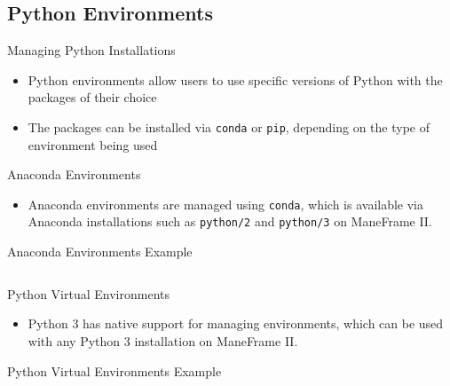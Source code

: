 \documentclass[aspectratio=169]{beamer}
\begin{document}
\subsection{Python Environments}

\begin{frame}{Managing Python Installations}
\begin{itemize}
\item Python environments allow users to use specific versions of Python with
the packages of their choice
\item The packages can be installed via \texttt{conda} or
\texttt{pip}, depending on the type of environment being used
\end{itemize}
\end{frame}

\begin{frame}{Anaconda Environments}
\begin{itemize}
\item Anaconda environments are managed using \texttt{conda}, which is
available via Anaconda installations such as \texttt{python/2} and
\texttt{python/3} on ManeFrame II.
\end{itemize}
\end{frame}

\begin{frame}{Anaconda Environments Example}
\begin{listing}[H]
\inputminted[firstline=3,firstnumber=1]{sh}{examples/conda_environments.sh}
\caption{A specific version of Python is installed along with the JupyterLab
package and its dependencies. The new environment is then loaded and then
unloaded.}
\end{listing}
\end{frame}

\begin{frame}{Python Virtual Environments}
\begin{itemize}
\item Python 3 has native support for managing environments, which can be used
with any Python 3 installation on ManeFrame II.
\end{itemize}
\end{frame}

\begin{frame}{Python Virtual Environments Example}
\begin{listing}[H]
\inputminted[firstline=3,firstnumber=1]{sh}{examples/python_environments.sh}
\caption{A specific installation of Python, in this case from Spack, is used
and then JupyterLab and its dependencies are installed. The new environment is
then loaded and then unloaded.}
\end{listing}
\end{frame}
\end{document}
